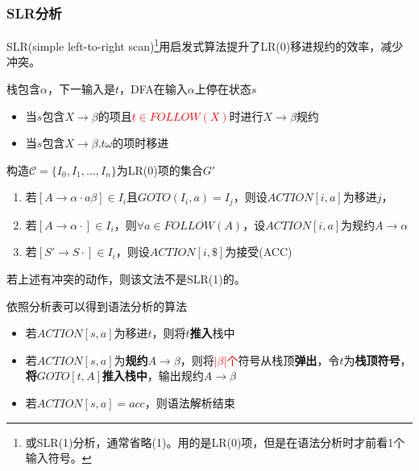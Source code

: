 \subsubsection{SLR分析}
SLR(simple left-to-right scan)\footnote{或SLR(1)分析，通常省略(1)。用的是LR(0)项，但是在语法分析时才前看1个输入符号。}用启发式算法提升了LR(0)移进规约的效率，减少冲突。
\begin{definition}[SLR(1)语法]
栈包含$\alpha$，下一输入是$t$，DFA在输入$\alpha$上停在状态$s$
\begin{itemize}
	\item 当$s$包含$X\to\beta$的项且\textcolor{red}{$t\in FOLLOW(X)$}时进行$X\to\beta$规约
	\item 当$s$包含$X\to\beta.t\omega$的项时移进
\end{itemize}
\end{definition}

\begin{myalgorithm}
构造$\mathcal{C}=\{I_0,I_1,\ldots,I_n\}$为LR(0)项的集合$G'$
\begin{enumerate}
	\item 若$[A\to\alpha\cdot a \beta]\in I_i$且$GOTO(I_i,a)=I_j$，则设$ACTION[i,a]$为移进$j$，
	\item 若$[A\to\alpha\cdot]\in I_i$，则$\forall a\in FOLLOW(A)$，设$ACTION[i,a]$为规约$A\to\alpha$
	\item 若$[S'\to S\cdot]\in I_i$，则设$ACTION[i,\$]$为接受(ACC)
\end{enumerate}
若上述有冲突的动作，则该文法不是SLR(1)的。

依照分析表可以得到语法分析的算法
\begin{itemize}
	\item 若$ACTION[s,a]$为移进$t$，则将$t$\textbf{推入}栈中
	\item 若$ACTION[s,a]$为\textbf{规约$A\to\beta$}，则将\textcolor{red}{$|\beta|$个}符号从栈顶\textbf{弹出}，令$t$为\textbf{栈顶符号}，\textbf{将$GOTO[t,A]$推入栈中}，输出规约$A\to\beta$
	\item 若$ACTION[s,a]=acc$，则语法解析结束
\end{itemize}
\end{myalgorithm}

